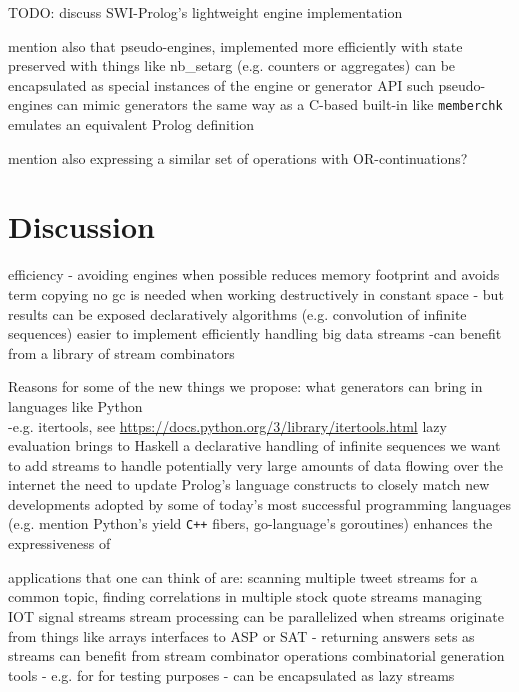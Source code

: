 \documentclass{new_tlp}
\begin{document}
{\Large TODO: discuss  SWI-Prolog's lightweight engine implementation}

\BI
\I mention also that pseudo-engines, implemented more efficiently with state
preserved with things like nb\_setarg (e.g. counters or aggregates) can be encapsulated as special instances of the engine or generator API
\I such pseudo-engines can mimic generators the same way as a C-based built-in like {\tt memberchk} emulates an equivalent Prolog definition 

\I mention also expressing a similar set of operations with OR-continuations?
\EI

\section{Discussion}



\BI
 \I efficiency - avoiding engines when possible reduces memory footprint and avoids term copying
\I no gc is needed when working destructively in constant space - but results can be exposed declaratively
\I algorithms (e.g. convolution of infinite sequences) easier to implement efficiently
\I handling big data streams -can benefit from a library of stream combinators
\EI


Reasons for some of the new things we propose:
\BI
\I what generators can bring in languages like Python \\-e.g. itertools, 
see \url{https://docs.python.org/3/library/itertools.html}
\I lazy evaluation brings to Haskell a declarative handling of infinite sequences
\I we want to add streams to
handle potentially very large amounts of data flowing over the internet
\I the need to update Prolog's language constructs to closely match new developments adopted by some of today's most successful programming languages (e.g. mention Python's yield \verb~C++~ fibers, go-language's goroutines)
\EI
enhances the expressiveness of  

\BI
\I  applications that one can think of are:
\BI
\I scanning multiple tweet streams for a common topic, 
\I finding correlations in multiple stock quote streams 
\I managing IOT signal streams
\I stream processing  can be parallelized when streams originate from things like arrays
\I interfaces to ASP or SAT - returning answers sets as streams can benefit from stream combinator operations
\I combinatorial generation tools - e.g. for for testing purposes - can be encapsulated as lazy streams
\EI
\EI
\end{document}
